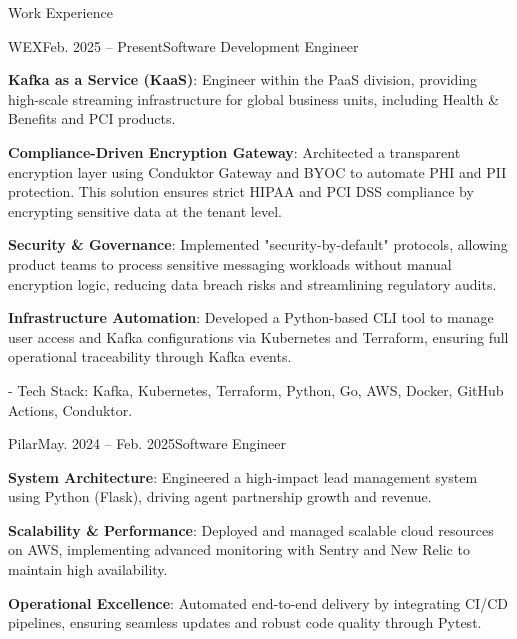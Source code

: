 \documentclass{resume} %
\begin{document}
\begin{rSection}{Work Experience}

\begin{rSubsection}{WEX}{Feb. 2025 -- Present}{Software Development Engineer}{}

\item \textbf{Kafka as a Service (KaaS)}: Engineer within the PaaS division, providing high-scale streaming infrastructure for global business 
units, including Health \& Benefits and PCI products.

\item \textbf{Compliance-Driven Encryption Gateway}: Architected a transparent encryption layer using Conduktor Gateway and BYOC to automate 
PHI and PII protection. This solution ensures strict HIPAA and PCI DSS compliance by encrypting sensitive data at the tenant level.

\item \textbf{Security \& Governance}: Implemented "security-by-default" protocols, allowing product teams to process sensitive messaging 
workloads without manual encryption logic, reducing data breach risks and streamlining regulatory audits.

\item \textbf{Infrastructure Automation}: Developed a Python-based CLI tool to manage user access and Kafka configurations via Kubernetes and 
Terraform, ensuring full operational traceability through Kafka events.

- Tech Stack: Kafka, Kubernetes, Terraform, Python, Go, AWS, Docker, GitHub Actions, Conduktor.
\end{rSubsection}

\begin{rSubsection}{Pilar}{May. 2024 -- Feb. 2025}{Software Engineer}{}

\item \textbf{System Architecture}: Engineered a high-impact lead management system using Python (Flask), driving agent partnership growth and revenue.

\item \textbf{Scalability \& Performance}: Deployed and managed scalable cloud resources on AWS, implementing advanced monitoring with Sentry and New 
Relic to maintain high availability.

\item \textbf{Operational Excellence}: Automated end-to-end delivery by integrating CI/CD pipelines, ensuring seamless updates and robust code quality through Pytest.


\end{rSubsection}
\end{rSection}
\end{document}

